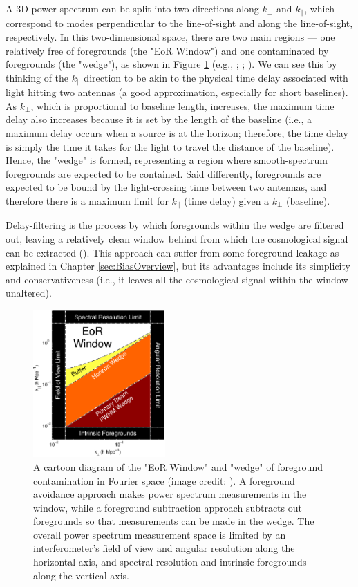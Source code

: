 A 3D power spectrum can be split into two directions along $k_{\perp}$ and $k_{\parallel}$, which correspond to modes perpendicular to the line-of-sight and along the line-of-sight, respectively. In this two-dimensional space, there are two main regions --- one relatively free of foregrounds (the "EoR Window") and one contaminated by foregrounds (the "wedge"), as shown in Figure \ref{fig:wedge} (e.g., \citealt{datta_et_al2010}; \citealt{vedantham_et_al2012}; \citealt{pober_et_al2013b}). We can see this by thinking of the $k_{\parallel}$ direction to be akin to the physical time delay associated with light hitting two antennas (a good approximation, especially for short baselines). As $k_{\perp}$, which is proportional to baseline length, increases, the maximum time delay also increases because it is set by the length of the baseline (i.e., a maximum delay occurs when a source is at the horizon; therefore, the time delay is simply the time it takes for the light to travel the distance of the baseline). Hence, the "wedge" is formed, representing a region where smooth-spectrum foregrounds are expected to be contained. Said differently, foregrounds are expected to be bound by the light-crossing time between two antennas, and therefore there is a maximum limit for $k_{\parallel}$ (time delay) given a $k_{\perp}$ (baseline). 

Delay-filtering is the process by which foregrounds within the wedge are filtered out, leaving a relatively clean window behind from which the cosmological signal can be extracted (\citealt{parsons_et_al2012b}). This approach can suffer from some foreground leakage as explained in Chapter \ref{sec:BiasOverview}, but its advantages include its simplicity and conservativeness (i.e., it leaves all the cosmological signal within the window unaltered).

\begin{figure}
    \centering
    \includegraphics[width=0.45\textwidth]{plots/wedge.pdf}
    \caption{A cartoon diagram of the "EoR Window" and "wedge" of foreground contamination in Fourier space (image credit: \citet{dillon_et_al2015b}). A foreground avoidance approach makes power spectrum measurements in the window, while a foreground subtraction approach subtracts out foregrounds so that measurements can be made in the wedge. The overall power spectrum measurement space is limited by an interferometer's field of view and angular resolution along the horizontal axis, and spectral resolution and intrinsic foregrounds along the vertical axis.}
    \label{fig:wedge}
\end{figure}

